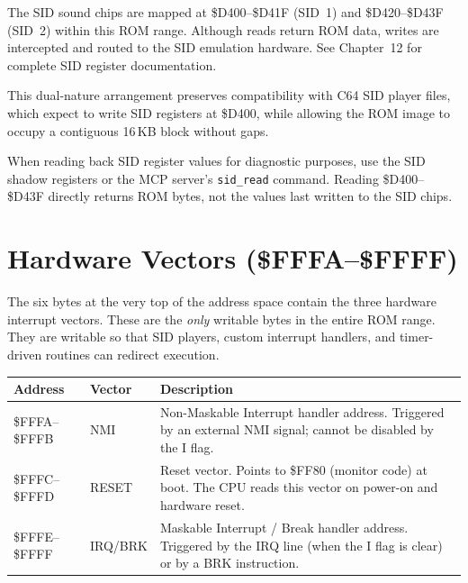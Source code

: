 The SID sound chips are mapped at \$D400--\$D41F (SID~1) and
\$D420--\$D43F (SID~2) within this ROM range.  Although reads return ROM
data, writes are intercepted and routed to the SID emulation hardware.
See Chapter~12 for complete SID register documentation.

This dual-nature arrangement preserves compatibility with C64 SID player
files, which expect to write SID registers at \$D400, while allowing the
ROM image to occupy a contiguous 16\,KB block without gaps.

\begin{tipbox}
When reading back SID register values for diagnostic purposes, use the
SID shadow registers or the MCP server's \texttt{sid\_read} command.
Reading \$D400--\$D43F directly returns ROM bytes, not the values last
written to the SID chips.
\end{tipbox}


\section{Hardware Vectors (\$FFFA--\$FFFF)}
\label{sec:vectors}


The six bytes at the very top of the address space contain the three
hardware interrupt vectors.  These are the \emph{only} writable bytes in
the entire ROM range.  They are writable so that SID players, custom
interrupt handlers, and timer-driven routines can redirect execution.

\begin{center}
\small
\begin{tabular}{@{}llp{7.5cm}@{}}
\toprule
\textbf{Address} & \textbf{Vector} & \textbf{Description} \\
\midrule
\$FFFA--\$FFFB & NMI   & Non-Maskable Interrupt handler address.  Triggered
                          by an external NMI signal; cannot be disabled by
                          the I flag. \\
\$FFFC--\$FFFD & RESET & Reset vector.  Points to \$FF80 (monitor code) at
                          boot.  The CPU reads this vector on power-on and
                          hardware reset. \\
\$FFFE--\$FFFF & IRQ/BRK & Maskable Interrupt / Break handler address.
                            Triggered by the IRQ line (when the I flag is
                            clear) or by a BRK instruction. \\
\bottomrule
\end{tabular}
\end{center}

